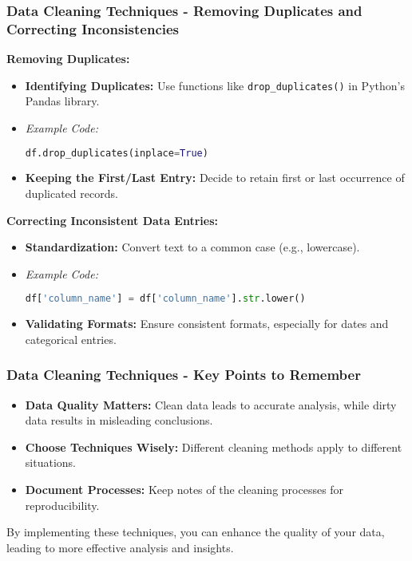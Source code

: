 \documentclass[aspectratio=169]{beamer}
\begin{document}
\begin{frame}[fragile]
    \frametitle{Data Cleaning Techniques - Removing Duplicates and Correcting Inconsistencies}
    \textbf{Removing Duplicates:}
    \begin{itemize}
        \item \textbf{Identifying Duplicates:} Use functions like \texttt{drop_duplicates()} in Python's Pandas library.
        \item \textit{Example Code:}
        \begin{lstlisting}[language=Python]
df.drop_duplicates(inplace=True)
        \end{lstlisting}
        \item \textbf{Keeping the First/Last Entry:} Decide to retain first or last occurrence of duplicated records.
    \end{itemize}
    
    \textbf{Correcting Inconsistent Data Entries:}
    \begin{itemize}
        \item \textbf{Standardization:} Convert text to a common case (e.g., lowercase).
        \item \textit{Example Code:}
        \begin{lstlisting}[language=Python]
df['column_name'] = df['column_name'].str.lower()
        \end{lstlisting}
        \item \textbf{Validating Formats:} Ensure consistent formats, especially for dates and categorical entries.
    \end{itemize}
\end{frame}

\begin{frame}[fragile]
    \frametitle{Data Cleaning Techniques - Key Points to Remember}
    \begin{itemize}
        \item \textbf{Data Quality Matters:} Clean data leads to accurate analysis, while dirty data results in misleading conclusions.
        \item \textbf{Choose Techniques Wisely:} Different cleaning methods apply to different situations.
        \item \textbf{Document Processes:} Keep notes of the cleaning processes for reproducibility.
    \end{itemize}
    By implementing these techniques, you can enhance the quality of your data, leading to more effective analysis and insights.
\end{frame}
\end{document}
